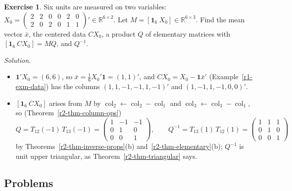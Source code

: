 \documentclass[12pt]{article}
\newcommand{\R}{\mathbb R}
\newcommand{\one}{\mathbf 1}
\DeclareMathOperator{\col}{col}
\theoremstyle{definition}
\newtheorem{exercise}{Exercise}
\newenvironment{solution}{\par\noindent\textit{Solution.}\ }{\par\smallskip}
\begin{document}
\begin{exercise}\label{r2-dr-centering}
Six units are measured on two variables:
\(X_0=\begin{pmatrix}2&2&0&0&2&0\\2&0&2&0&1&1\end{pmatrix}'\in\R^{6\times2}\). Let \(M=[\one_6\ X_0]\in\R^{6\times3}\).
Find the mean vector \(\bar x\), the centered data \(CX_0\), a product \(Q\) of elementary matrices with
\([\one_6\ CX_0]=MQ\), and \(Q^{-1}\).
\end{exercise}
\begin{solution}
\begin{itemize}
\item \(\one'X_0=(6,6)\), so \(\bar x=\frac16X_0'\one=(1,1)'\), and \(CX_0=X_0-\one\bar x'\)
(Example~\ref{r1-exm-data}) has the columns \((1,1,-1,-1,1,-1)'\) and \((1,-1,1,-1,0,0)'\).
\item \([\one_6\ CX_0]\) arises from \(M\) by \(\col_2\leftarrow\col_2-\col_1\) and \(\col_3\leftarrow\col_3-\col_1\), so
(Theorem~\ref{r2-thm-column-ops})
\[
Q=T_{12}(-1)\,T_{13}(-1)=\begin{pmatrix}1&-1&-1\\0&1&0\\0&0&1\end{pmatrix},\qquad
Q^{-1}=T_{13}(1)\,T_{12}(1)=\begin{pmatrix}1&1&1\\0&1&0\\0&0&1\end{pmatrix}
\]
by Theorems~\ref{r2-thm-inverse-props}(b) and~\ref{r2-thm-elementary}(b); \(Q^{-1}\) is unit upper triangular, as
Theorem~\ref{r2-thm-triangular} says.
\end{itemize}
\end{solution}

\subsection*{Problems}
\end{document}
